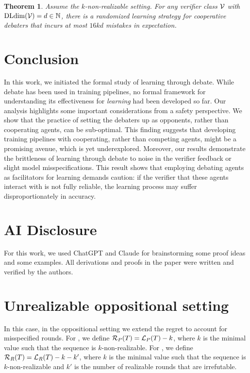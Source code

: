 \documentclass[11pt,letterpaper]{article}
\newtheorem{theorem}{Theorem}
\theoremstyle{definition}
\theoremstyle{plain}
\begin{document}
\begin{theorem}\label{thm:upperkd}
    Assume the $k$-non-realizable setting. For any verifier class ${\mathcal V}$ with $\mathrm{DLdim}({\mathcal V}) = d \in \mathbb{N}$, there is a randomized learning strategy for cooperative debaters that incurs at most $16kd$ mistakes in expectation. 
\end{theorem}


\section{Conclusion}

In this work, we initiated the formal study of learning through debate. While debate has been used in training pipelines, no formal framework for understanding its effectiveness for \emph{learning} had been developed so far. Our analysis highlights some important considerations from a safety perspective. We show that the practice of setting the debaters up as opponents, rather than cooperating agents, can be sub-optimal. 
This finding suggests that developing training pipelines with cooperating, rather than competing agents, might be a promising avenue, which is yet underexplored.
Moreover, our results demonstrate the brittleness of learning through debate to noise in the verifier feedback or slight model misspecifications. This result shows that employing debating agents as facilitators for learning demands caution: if the verifier that these agents interact with is not fully reliable, the learning process may suffer disproportionately in accuracy.

\section*{AI Disclosure}

For this work, we used ChatGPT and Claude for brainstorming some proof ideas and some examples. All derivations and proofs in the paper were written and verified by the authors.


\iffalse
\section{Unrealizable oppositional setting }

In this case, in the oppositional setting we extend the regret to account for misspecified rounds. For \dt, we define ${{\mathcal R}_P}(T) = {{\mathcal L}_P}(T) - k$, where $k$ is the minimal value such that the sequence is $k$-non-realizable. For \df, we define 
${{\mathcal R}_R}(T) = {{\mathcal L}_R}(T) - k - k'$, where $k$ is the minimal value such that the sequence is $k$-non-realizable and $k'$ is the number of realizable rounds that are irrefutable. 
\end{document}
